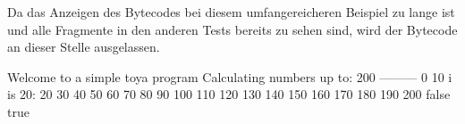 Da das Anzeigen des Bytecodes bei diesem umfangereicheren Beispiel zu lange ist und alle Fragmente in den anderen Tests bereits zu sehen sind, wird der Bytecode an dieser Stelle ausgelassen.

\begin{ToyaCode}[numbers=none, caption={Konsolen-Ausgabe des umfangereicheren Beispiels}]
Welcome to a simple toya program
Calculating numbers up to:
200
---------
0
10
i is 20:
20
30
40
50
60
70
80
90
100
110
120
130
140
150
160
170
180
190
200
false
true    
\end{ToyaCode}